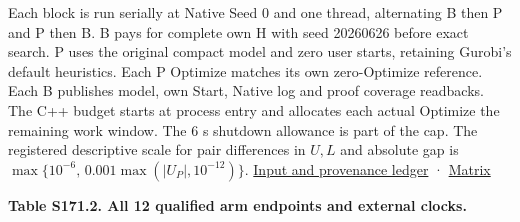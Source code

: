 \documentclass[
  american,
  11pt,
]{article}
\begin{document}
Each block is run serially at Native Seed 0 and one thread, alternating
B then P and P then B. B pays for complete own H with seed 20260626
before exact search. P uses the original compact model and zero user
starts, retaining Gurobi's default heuristics. Each P Optimize matches
its own zero-Optimize reference. Each B publishes model, own Start,
Native log and proof coverage readbacks. The C++ budget starts at
process entry and allocates each actual Optimize the remaining work
window. The 6 s shutdown allowance is part of the cap. The registered
descriptive scale for pair differences in \(U,L\) and absolute gap is
\(\max\{10^{-6},\,0.001\max(|U_P|,10^{-12})\}\).
\href{https://github.com/yifanXovo/TailoredExact/blob/codex/round172-journal-manuscript/results/unified_exact_round171/input_manifest.json}{Input
and provenance ledger} ·
\href{https://github.com/yifanXovo/TailoredExact/blob/codex/round172-journal-manuscript/results/unified_exact_round171/matrix_frozen.json}{Matrix}



\textbf{Table S171.2. All 12 qualified arm endpoints and external
clocks.}
\end{document}
